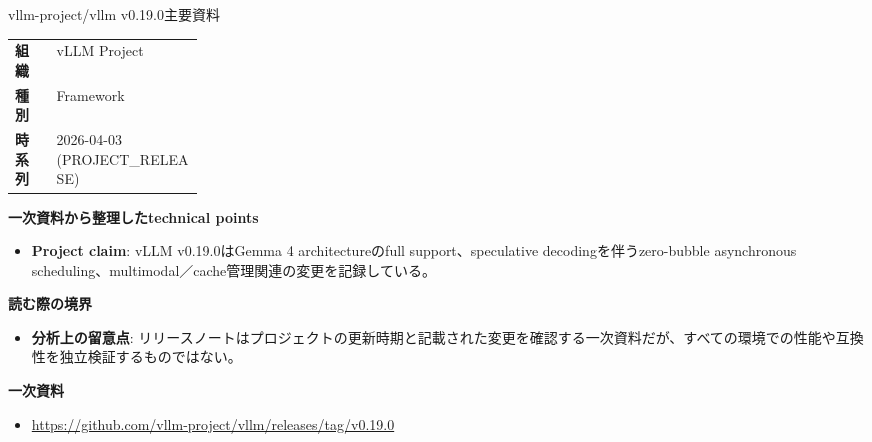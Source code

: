 \begin{technicalnote}{vllm-project/vllm v0.19.0}{主要資料}
\begingroup
\begin{tabularx}{\linewidth}{@{}>{\bfseries}p{0.22\linewidth}X@{}}
組織 & vLLM Project \\
種別 & Framework \\
時系列 & 2026-04-03 (PROJECT\_RELEASE) \\
\end{tabularx}
\smallskip
{\bfseries 一次資料から整理したtechnical points}
\begin{itemize}[leftmargin=1.5em,itemsep=0.35em]
\item \textbf{Project claim}: vLLM v0.19.0はGemma 4 architectureのfull support、speculative decodingを伴うzero-bubble asynchronous scheduling、multimodal／cache管理関連の変更を記録している。
\end{itemize}
{\bfseries 読む際の境界}
\begin{itemize}[leftmargin=1.5em,itemsep=0.35em]
\item \textbf{分析上の留意点}: リリースノートはプロジェクトの更新時期と記載された変更を確認する一次資料だが、すべての環境での性能や互換性を独立検証するものではない。
\end{itemize}
\begin{samepage}
{\bfseries 一次資料}
\begingroup\sloppy
\begin{itemize}[leftmargin=1.5em,itemsep=0.25em]
\item {\scriptsize\url{https://github.com/vllm-project/vllm/releases/tag/v0.19.0}}
\end{itemize}
\endgroup
\end{samepage}
\endgroup
\end{technicalnote}
\medskip

